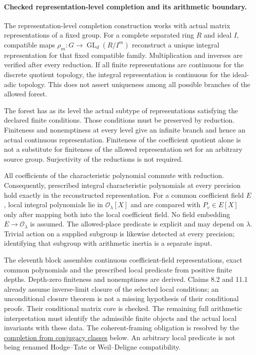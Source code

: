 \documentclass[11pt]{article}
\theoremstyle{definition}
\theoremstyle{remark}
\newcommand{\Ocal}{\mathcal O}
\begin{document}
\paragraph{Checked representation-level completion and its arithmetic boundary.}
The representation-level completion construction works with actual matrix
representations of a fixed group. For a complete separated ring $R$
and ideal $I$, compatible maps
$\rho_m:G\to\operatorname{GL}_d(R/I^m)$ reconstruct a unique integral
representation for that fixed compatible family. Multiplication and inverses
are verified after every reduction. If all finite representations are continuous
for the discrete quotient topology, the integral representation is continuous
for the ideal-adic topology. This does not assert uniqueness among all possible
branches of the allowed forest.

The forest has as its level the actual subtype of representations satisfying
the declared finite conditions. Those conditions must be preserved by reduction.
Finiteness and nonemptiness at every level give an infinite branch and hence an
actual continuous representation. Finiteness of the coefficient quotient alone
is not a substitute for finiteness of the allowed representation set for an
arbitrary source group. Surjectivity of the reductions is not required.

All coefficients of the characteristic polynomial commute with reduction.
Consequently, prescribed integral characteristic polynomials at every precision
hold exactly in the reconstructed representation. For a common coefficient field
$E$, local integral polynomials lie in $\Ocal_\lambda[X]$ and are compared with
$P_v\in E[X]$ only after mapping both into the local coefficient field. No field
embedding $E\to\Ocal_\lambda$ is assumed. The allowed-place predicate is explicit
and may depend on $\lambda$. Trivial action on a supplied subgroup is likewise
detected at every precision; identifying that subgroup with arithmetic inertia
is a separate input.

The eleventh block assembles continuous coefficient-field representations, exact
common polynomials and the prescribed local predicate from positive finite
depths. Depth-zero finiteness and nonemptiness are derived. Claims 8.2 and 11.1
already assume inverse-limit closure of the selected local conditions; an
unconditional closure theorem is not a missing hypothesis of their conditional
proofs. Their conditional matrix core is checked. The remaining full arithmetic
interpretation must identify the admissible finite objects and the actual local
invariants with these data. The coherent-framing obligation is resolved by the \hyperref[book:x-construction-14]{completion from conjugacy classes}
below. An arbitrary local
predicate is not being renamed Hodge--Tate or Weil--Deligne compatibility.
\end{document}
